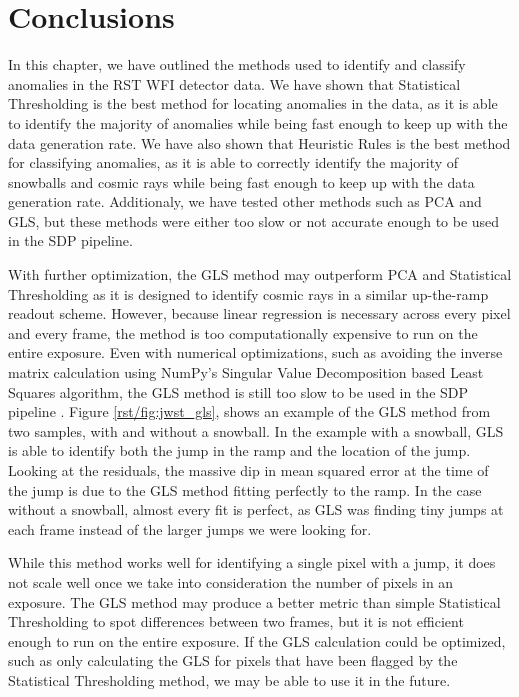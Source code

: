 \section{Conclusions}
\label{rst/sec:conclusions}
In this chapter, we have outlined the methods used to identify and classify anomalies in the RST WFI detector data.
We have shown that Statistical Thresholding is the best method for locating anomalies in the data, as it is able to identify the majority of anomalies while being fast enough to keep up with the data generation rate.
We have also shown that Heuristic Rules is the best method for classifying anomalies, as it is able to correctly identify the majority of snowballs and cosmic rays while being fast enough to keep up with the data generation rate.
Additionaly, we have tested other methods such as PCA and GLS, but these methods were either too slow or not accurate enough to be used in the SDP pipeline.

With further optimization, the GLS method may outperform PCA and Statistical Thresholding as it is designed to identify cosmic rays in a similar up-the-ramp readout scheme.
However, because linear regression is necessary across every pixel and every frame, the method is too computationally expensive to run on the entire exposure.
Even with numerical optimizations, such as avoiding the inverse matrix calculation using NumPy's Singular Value Decomposition based Least Squares algorithm, the GLS method is still too slow to be used in the SDP pipeline \cite{harris2020array}.
Figure \ref{rst/fig:jwst_gls}, shows an example of the GLS method from two samples, with and without a snowball.
In the example with a snowball, GLS is able to identify both the jump in the ramp and the location of the jump.
Looking at the residuals, the massive dip in mean squared error at the time of the jump is due to the GLS method fitting perfectly to the ramp.
In the case without a snowball, almost every fit is perfect, as GLS was finding tiny jumps at each frame instead of the larger jumps we were looking for.

While this method works well for identifying a single pixel with a jump, it does not scale well once we take into consideration the number of pixels in an exposure.
The GLS method may produce a better metric than simple Statistical Thresholding to spot differences between two frames, but it is not efficient enough to run on the entire exposure.
If the GLS calculation could be optimized, such as only calculating the GLS for pixels that have been flagged by the Statistical Thresholding method, we may be able to use it in the future.

